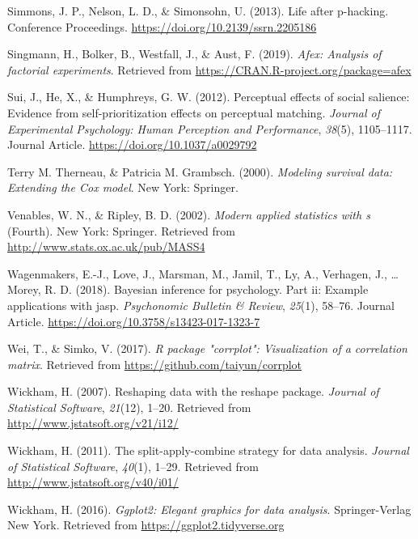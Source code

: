 \documentclass[
  english,
  man]{apa6}
\begin{document}
\leavevmode\hypertarget{ref-Simmons_2013_life}{}%
Simmons, J. P., Nelson, L. D., \& Simonsohn, U. (2013). Life after p-hacking. Conference Proceedings. \url{https://doi.org/10.2139/ssrn.2205186}

\leavevmode\hypertarget{ref-R-afex}{}%
Singmann, H., Bolker, B., Westfall, J., \& Aust, F. (2019). \emph{Afex: Analysis of factorial experiments}. Retrieved from \url{https://CRAN.R-project.org/package=afex}

\leavevmode\hypertarget{ref-Sui_2012_JEPHPP}{}%
Sui, J., He, X., \& Humphreys, G. W. (2012). Perceptual effects of social salience: Evidence from self-prioritization effects on perceptual matching. \emph{Journal of Experimental Psychology: Human Perception and Performance}, \emph{38}(5), 1105--1117. Journal Article. \url{https://doi.org/10.1037/a0029792}

\leavevmode\hypertarget{ref-R-survival-book}{}%
Terry M. Therneau, \& Patricia M. Grambsch. (2000). \emph{Modeling survival data: Extending the Cox model}. New York: Springer.

\leavevmode\hypertarget{ref-R-MASS}{}%
Venables, W. N., \& Ripley, B. D. (2002). \emph{Modern applied statistics with s} (Fourth). New York: Springer. Retrieved from \url{http://www.stats.ox.ac.uk/pub/MASS4}

\leavevmode\hypertarget{ref-Wagenmakers_2018_JASP}{}%
Wagenmakers, E.-J., Love, J., Marsman, M., Jamil, T., Ly, A., Verhagen, J., \ldots{} Morey, R. D. (2018). Bayesian inference for psychology. Part ii: Example applications with jasp. \emph{Psychonomic Bulletin \& Review}, \emph{25}(1), 58--76. Journal Article. \url{https://doi.org/10.3758/s13423-017-1323-7}

\leavevmode\hypertarget{ref-R-corrplot2017}{}%
Wei, T., \& Simko, V. (2017). \emph{R package "corrplot": Visualization of a correlation matrix}. Retrieved from \url{https://github.com/taiyun/corrplot}

\leavevmode\hypertarget{ref-R-reshape2}{}%
Wickham, H. (2007). Reshaping data with the reshape package. \emph{Journal of Statistical Software}, \emph{21}(12), 1--20. Retrieved from \url{http://www.jstatsoft.org/v21/i12/}

\leavevmode\hypertarget{ref-R-plyr}{}%
Wickham, H. (2011). The split-apply-combine strategy for data analysis. \emph{Journal of Statistical Software}, \emph{40}(1), 1--29. Retrieved from \url{http://www.jstatsoft.org/v40/i01/}

\leavevmode\hypertarget{ref-R-ggplot2}{}%
Wickham, H. (2016). \emph{Ggplot2: Elegant graphics for data analysis}. Springer-Verlag New York. Retrieved from \url{https://ggplot2.tidyverse.org}
\end{document}

